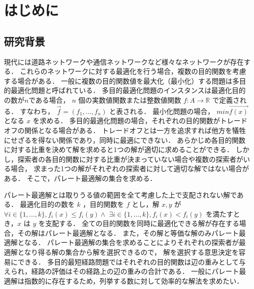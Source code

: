 \documentclass[12pt]{optlab-bachelor}
\begin{document}
\frontmatter %
\chapter{はじめに}
\section{研究背景}
現代には道路ネットワークや通信ネットワークなど様々なネットワークが存在する．
これらのネットワークに対する最適化を行う場合，複数の目的関数を考慮する場合がある．
一般に複数の目的関数値を最大化（最小化）する問題は多目的最適化問題と呼ばれている．
多目的最適化問題のインスタンスは最適化目的の数が$n$である場合，
$n$ 個の実数値関数または整数値関数 $f : A \rightarrow \mathbb{R}$ で定義される．
すなわち， $\vec{f} = (f_1 , \ldots , f_n)$ と表される．
最小化問題の場合， $min\vec{f(x)}$ となる $x$ を求める．
多目的最適化問題の場合，それぞれの目的関数がトレードオフの関係となる場合がある．
トレードオフとは一方を追求すれば他方を犠牲にせざるを得ない関係であり，同時に最適にできない．
あらかじめ各目的関数に対する比重を決めて解を求めると1つの解が適切に求めることができる．
しかし，探索者の各目的関数に対する比重が決まっていない場合や複数の探索者がいる場合，
求まった1つの解がそれぞれの探索者に対して適切な解ではない場合がある．
そこで，パレート最適解の集合を求める．


パレート最適解とは取りうる値の範囲を全て考慮した上で支配されない解である．
最適化目的の数を $k$ ，目的関数を $f$ とし，解 $x,y$ が
$\forall i \in \{1,\ldots,k\},f_i(x) \le f_i(y) \land $
$\exists i \in \{1,\ldots,k\},f_i(x) < f_i(y)$
を満たすとき，$x$ は $y$ を支配する．
全ての目的関数を同時に最適化できる解が存在する場合，その解はパレート最適解となる．
また，その解と等価な解のみパレート最適解となる．
パレート最適解の集合を求めることによりそれぞれの探索者が最適解となり得る解の集合から解を選択できるので，
解を選択する意思決定を容易にできる．
多目的最短経路問題ではそれぞれの目的関数は辺の重みとして与えられ，経路の評価はその経路上の辺の重みの合計である．
一般にパレート最適解は指数的に存在するため，列挙する数に対して効率的な解法を求めたい．
\end{document}
